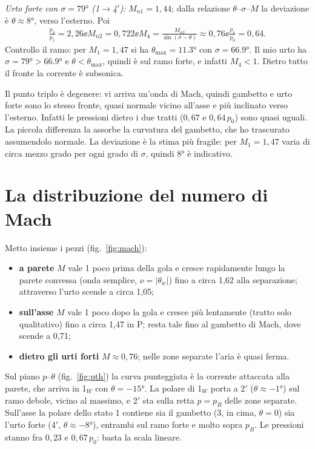 \emph{Urto forte con $\sigma=\ang{79}$ (1$\to$4$'$):} $M_{n1}=1{,}44$; dalla relazione $\theta$--$\sigma$--$M$ la
deviazione è $\theta\approx\ang{8}$, verso l'esterno. Poi
\begin{gather*}
\frac{p_4}{p_1}=2{,}26 \ee M_{n2}=0{,}722 \ee M_4=\frac{M_{n2}}{\sin(\sigma-\theta)}\approx0{,}76 \ee
\frac{p_4}{p_0}=0{,}64 .
\end{gather*}
Controllo il ramo: per $M_1=1{,}47$ si ha $\theta_{\max}=\ang{11.3}$ con $\sigma=\ang{66.9}$. Il mio urto ha
$\sigma=\ang{79}>\ang{66.9}$ e $\theta<\theta_{\max}$, quindi è sul ramo forte, e infatti $M_4<1$. Dietro tutto il fronte
la corrente è subsonica.

Il punto triplo è degenere: vi arriva un'onda di Mach, quindi gambetto e urto forte sono lo stesso fronte, quasi
normale vicino all'asse e più inclinato verso l'esterno. Infatti le pressioni dietro i due tratti ($0{,}67$ e
$0{,}64\,p_0$) sono quasi uguali. La piccola differenza la assorbe la curvatura del gambetto, che ho trascurato
assumendolo normale. La deviazione è la stima più fragile: per $M_1=1{,}47$ varia di circa mezzo grado per ogni grado
di $\sigma$, quindi $\ang{8}$ è indicativo.

\section*{La distribuzione del numero di Mach}
Metto insieme i pezzi (fig.~\ref{fig:mach}):
\begin{itemize}
\item \textbf{a parete} $M$ vale 1 poco prima della gola e cresce rapidamente lungo la parete convessa (onda
  semplice, $\nu=|\theta_w|$) fino a circa 1,62 alla separazione; attraverso l'urto scende a circa 1,05;
\item \textbf{sull'asse} $M$ vale 1 poco dopo la gola e cresce più lentamente (tratto solo qualitativo) fino a
  circa 1,47 in P; resta tale fino al gambetto di Mach, dove scende a 0,71;
\item \textbf{dietro gli urti forti} $M\approx0{,}76$; nelle zone separate l'aria è quasi ferma.
\end{itemize}

Sul piano $p$--$\theta$ (fig.~\ref{fig:pth}) la curva punteggiata è la corrente attaccata alla parete, che arriva in
1$_W$ con $\theta=\ang{-15}$. La polare di 1$_W$ porta a 2$'$ ($\theta\approx\ang{-1}$) sul ramo debole, vicino al
massimo, e 2$'$ sta sulla retta $p=p_B$ delle zone separate. Sull'asse la polare dello stato 1 contiene sia il
gambetto (3, in cima, $\theta=0$) sia l'urto forte (4$'$, $\theta\approx\ang{-8}$), entrambi sul ramo forte e
molto sopra $p_B$. Le pressioni stanno fra $0{,}23$ e $0{,}67\,p_0$: basta la scala lineare.

